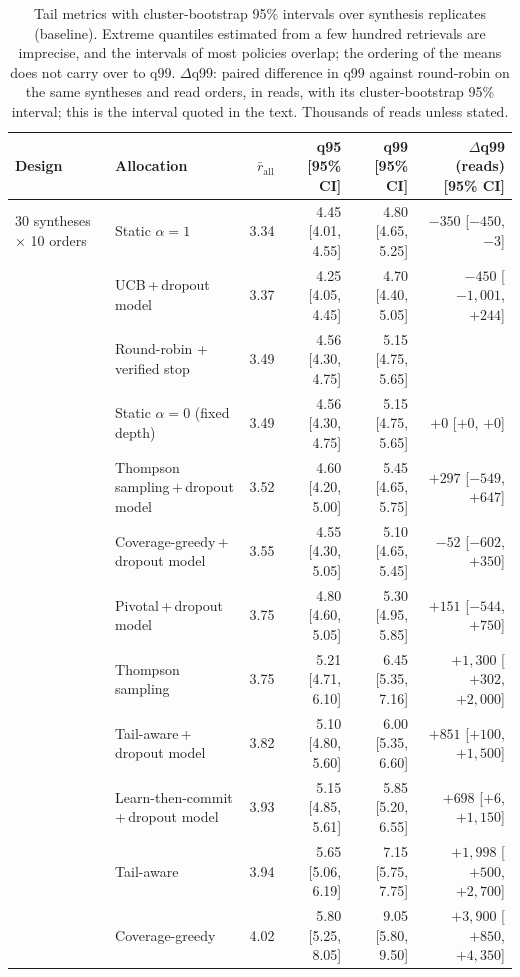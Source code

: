 \begin{table}[!t]
\centering
\caption{Tail metrics with cluster-bootstrap 95\% intervals over synthesis replicates (baseline).  Extreme quantiles estimated from a few hundred retrievals are imprecise, and the intervals of most policies overlap; the ordering of the means does not carry over to q99.  $\Delta$q99: paired difference in q99 against round-robin on the same syntheses and read orders, in reads, with its cluster-bootstrap 95\% interval; this is the interval quoted in the text.  Thousands of reads unless stated.}
\label{tab:r4tails}
\scriptsize
\setlength{\tabcolsep}{3pt}
\begin{tabular}{@{}llrrrr@{}}
\toprule
Design & Allocation & $\bar r_{\text{all}}$ & q95 [95\% CI] & q99 [95\% CI] & $\Delta$q99 (reads) [95\% CI] \\
\midrule
30 syntheses $\times$ 10 orders & Static $\alpha{=}1$ & 3.34 & 4.45 [4.01, 4.55] & 4.80 [4.65, 5.25] & $-350$ [$-450${,} $-3$] \\
 & UCB\,+\,dropout model & 3.37 & 4.25 [4.05, 4.45] & 4.70 [4.40, 5.05] & $-450$ [$-1{,}001${,} $+244$] \\
 & Round-robin + verified stop & 3.49 & 4.56 [4.30, 4.75] & 5.15 [4.75, 5.65] &  \\
 & Static $\alpha{=}0$ (fixed depth) & 3.49 & 4.56 [4.30, 4.75] & 5.15 [4.75, 5.65] & $+0$ [$+0${,} $+0$] \\
 & Thompson sampling\,+\,dropout model & 3.52 & 4.60 [4.20, 5.00] & 5.45 [4.65, 5.75] & $+297$ [$-549${,} $+647$] \\
 & Coverage-greedy\,+\,dropout model & 3.55 & 4.55 [4.30, 5.05] & 5.10 [4.65, 5.45] & $-52$ [$-602${,} $+350$] \\
 & Pivotal\,+\,dropout model & 3.75 & 4.80 [4.60, 5.05] & 5.30 [4.95, 5.85] & $+151$ [$-544${,} $+750$] \\
 & Thompson sampling & 3.75 & 5.21 [4.71, 6.10] & 6.45 [5.35, 7.16] & $+1{,}300$ [$+302${,} $+2{,}000$] \\
 & Tail-aware\,+\,dropout model & 3.82 & 5.10 [4.80, 5.60] & 6.00 [5.35, 6.60] & $+851$ [$+100${,} $+1{,}500$] \\
 & Learn-then-commit\,+\,dropout model & 3.93 & 5.15 [4.85, 5.61] & 5.85 [5.20, 6.55] & $+698$ [$+6${,} $+1{,}150$] \\
 & Tail-aware & 3.94 & 5.65 [5.06, 6.19] & 7.15 [5.75, 7.75] & $+1{,}998$ [$+500${,} $+2{,}700$] \\
 & Coverage-greedy & 4.02 & 5.80 [5.25, 8.05] & 9.05 [5.80, 9.50] & $+3{,}900$ [$+850${,} $+4{,}350$] \\

\end{tabular}
\end{table}
